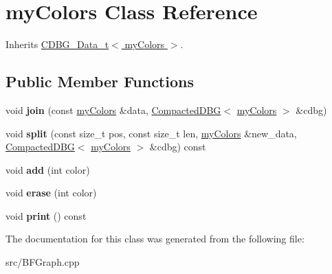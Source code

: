 \hypertarget{classmyColors}{}\section{my\+Colors Class Reference}
\label{classmyColors}


Inherits \hyperlink{classCDBG__Data__t}{C\+D\+B\+G\+\_\+\+Data\+\_\+t$<$ my\+Colors $>$}.

\subsection*{Public Member Functions}
\begin{DoxyCompactItemize}
\item 
\mbox{\label{classmyColors_a031f956e5039aa217b14781e370c3f45}} 
void {\bfseries join} (const \hyperlink{classmyColors}{my\+Colors} \&data, \hyperlink{classCompactedDBG}{Compacted\+D\+BG}$<$ \hyperlink{classmyColors}{my\+Colors} $>$ \&cdbg)
\item 
\mbox{\label{classmyColors_ad703f2aff04d0157c6f4d5fca41d357b}} 
void {\bfseries split} (const size\+\_\+t pos, const size\+\_\+t len, \hyperlink{classmyColors}{my\+Colors} \&new\+\_\+data, \hyperlink{classCompactedDBG}{Compacted\+D\+BG}$<$ \hyperlink{classmyColors}{my\+Colors} $>$ \&cdbg) const
\item 
\mbox{\label{classmyColors_ae7e080326a1835c7cf9278187587022a}} 
void {\bfseries add} (int color)
\item 
\mbox{\label{classmyColors_abb96e91295f4869f73dc8a886c68455f}} 
void {\bfseries erase} (int color)
\item 
\mbox{\label{classmyColors_a92f8067281665d5aab8d0e3b214dc717}} 
void {\bfseries print} () const
\end{DoxyCompactItemize}


The documentation for this class was generated from the following file\+:\begin{DoxyCompactItemize}
\item 
src/B\+F\+Graph.\+cpp\end{DoxyCompactItemize}
